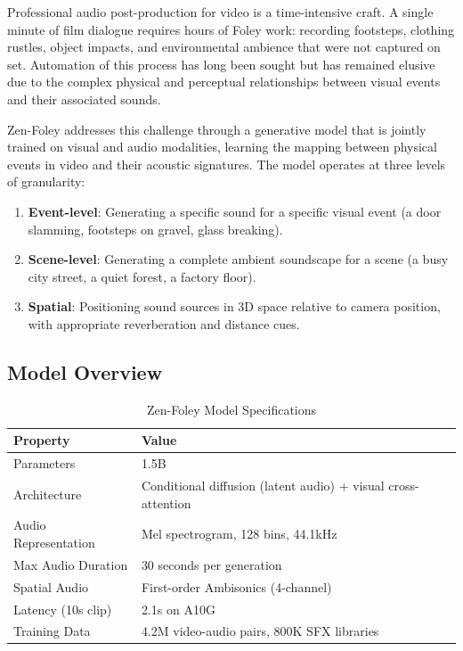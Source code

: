 \documentclass[11pt,a4paper]{article}
\begin{document}
Professional audio post-production for video is a time-intensive craft. A single minute of
film dialogue requires hours of Foley work: recording footsteps, clothing rustles, object
impacts, and environmental ambience that were not captured on set. Automation of this process
has long been sought but has remained elusive due to the complex physical and perceptual
relationships between visual events and their associated sounds.

Zen-Foley addresses this challenge through a generative model that is jointly trained on
visual and audio modalities, learning the mapping between physical events in video and their
acoustic signatures. The model operates at three levels of granularity:

\begin{enumerate}
    \item \textbf{Event-level}: Generating a specific sound for a specific visual event
    (a door slamming, footsteps on gravel, glass breaking).
    \item \textbf{Scene-level}: Generating a complete ambient soundscape for a scene
    (a busy city street, a quiet forest, a factory floor).
    \item \textbf{Spatial}: Positioning sound sources in 3D space relative to camera
    position, with appropriate reverberation and distance cues.
\end{enumerate}

\subsection{Model Overview}

\begin{table}[H]
\centering
\begin{tabular}{ll}
\toprule
\textbf{Property} & \textbf{Value} \\
\midrule
Parameters & 1.5B \\
Architecture & Conditional diffusion (latent audio) + visual cross-attention \\
Audio Representation & Mel spectrogram, 128 bins, 44.1kHz \\
Max Audio Duration & 30 seconds per generation \\
Spatial Audio & First-order Ambisonics (4-channel) \\
Latency (10s clip) & 2.1s on A10G \\
Training Data & 4.2M video-audio pairs, 800K SFX libraries \\
\bottomrule
\end{tabular}
\caption{Zen-Foley Model Specifications}
\end{table}
\end{document}
